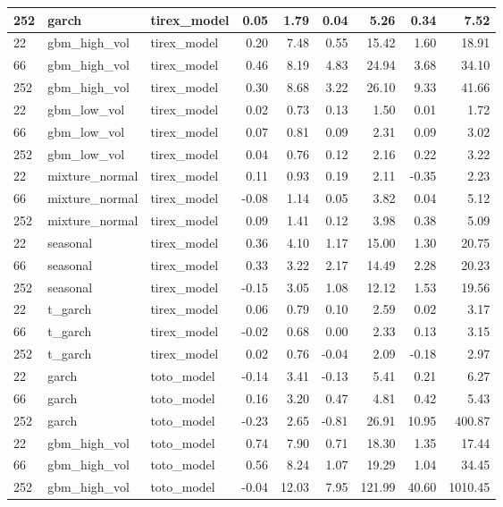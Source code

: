 {\begin{tabular}{lllrrrrrr}
252 & garch & tirex\_model & 0.05 & 1.79 & 0.04 & 5.26 & 0.34 & 7.52 \\
\midrule
22 & gbm\_high\_vol & tirex\_model & 0.20 & 7.48 & 0.55 & 15.42 & 1.60 & 18.91 \\
66 & gbm\_high\_vol & tirex\_model & 0.46 & 8.19 & 4.83 & 24.94 & 3.68 & 34.10 \\
252 & gbm\_high\_vol & tirex\_model & 0.30 & 8.68 & 3.22 & 26.10 & 9.33 & 41.66 \\
\midrule
22 & gbm\_low\_vol & tirex\_model & 0.02 & 0.73 & 0.13 & 1.50 & 0.01 & 1.72 \\
66 & gbm\_low\_vol & tirex\_model & 0.07 & 0.81 & 0.09 & 2.31 & 0.09 & 3.02 \\
252 & gbm\_low\_vol & tirex\_model & 0.04 & 0.76 & 0.12 & 2.16 & 0.22 & 3.22 \\
\midrule
22 & mixture\_normal & tirex\_model & 0.11 & 0.93 & 0.19 & 2.11 & -0.35 & 2.23 \\
66 & mixture\_normal & tirex\_model & -0.08 & 1.14 & 0.05 & 3.82 & 0.04 & 5.12 \\
252 & mixture\_normal & tirex\_model & 0.09 & 1.41 & 0.12 & 3.98 & 0.38 & 5.09 \\
\midrule
22 & seasonal & tirex\_model & 0.36 & 4.10 & 1.17 & 15.00 & 1.30 & 20.75 \\
66 & seasonal & tirex\_model & 0.33 & 3.22 & 2.17 & 14.49 & 2.28 & 20.23 \\
252 & seasonal & tirex\_model & -0.15 & 3.05 & 1.08 & 12.12 & 1.53 & 19.56 \\
\midrule
22 & t\_garch & tirex\_model & 0.06 & 0.79 & 0.10 & 2.59 & 0.02 & 3.17 \\
66 & t\_garch & tirex\_model & -0.02 & 0.68 & 0.00 & 2.33 & 0.13 & 3.15 \\
252 & t\_garch & tirex\_model & 0.02 & 0.76 & -0.04 & 2.09 & -0.18 & 2.97 \\
\midrule
22 & garch & toto\_model & -0.14 & 3.41 & -0.13 & 5.41 & 0.21 & 6.27 \\
66 & garch & toto\_model & 0.16 & 3.20 & 0.47 & 4.81 & 0.42 & 5.43 \\
252 & garch & toto\_model & -0.23 & 2.65 & -0.81 & 26.91 & 10.95 & 400.87 \\
\midrule
22 & gbm\_high\_vol & toto\_model & 0.74 & 7.90 & 0.71 & 18.30 & 1.35 & 17.44 \\
66 & gbm\_high\_vol & toto\_model & 0.56 & 8.24 & 1.07 & 19.29 & 1.04 & 34.45 \\
252 & gbm\_high\_vol & toto\_model & -0.04 & 12.03 & 7.95 & 121.99 & 40.60 & 1010.45 \\

\end{tabular}}
